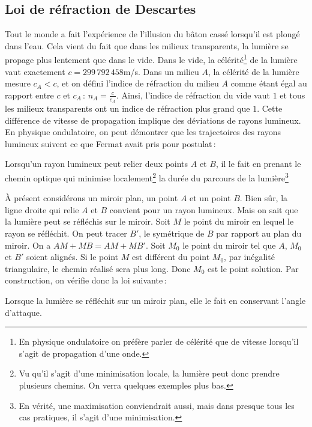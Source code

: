 	\subsection{Loi de réfraction de Descartes}
		Tout le monde a fait l'expérience de l'illusion du bâton cassé lorsqu'il est plongé dans l'eau. Cela vient du fait que dans les milieux transparents, la lumière se propage plus lentement que dans le vide. Dans le vide, la célérité\footnote{En physique ondulatoire on préfère parler de célérité que de vitesse lorsqu'il s'agit de propagation d'une onde.} de la lumière vaut exactement $c=299\,792\,458$m/s. Dans un milieu $A$, la célérité de la lumière mesure $c_A<c$, et on défini l'indice de réfraction du milieu $A$ comme étant égal au rapport entre $c$ et $c_A$\,: $n_A=\frac{c}{c_A}$. Ainsi, l'indice de réfraction du vide vaut $1$ et tous les milieux transparents ont un indice de réfraction plus grand que $1$. Cette différence de vitesse de propagation implique des déviations de rayons lumineux. En physique ondulatoire, on peut démontrer que les trajectoires des rayons lumineux suivent ce que Fermat avait pris pour postulat\,:
		\begin{post}
			Lorsqu'un rayon lumineux peut relier deux points $A$ et $B$, il le fait en prenant le chemin optique qui minimise localement\footnote{Vu qu'il s'agit d'une minimisation locale, la lumière peut donc prendre plusieurs chemins. On verra quelques exemples plus bas.} la durée du parcours de la lumière\footnote{En vérité, une maximisation conviendrait aussi, mais dans presque tous les cas pratiques, il s'agit d'une minimisation.}
		\end{post}

		À présent considérons un miroir plan, un point $A$ et un point $B$. Bien sûr, la ligne droite qui relie $A$ et $B$ convient pour un rayon lumineux. Mais on sait que la lumière peut se réfléchis sur le miroir. Soit $M$ le point du miroir en lequel le rayon se réfléchit. On peut tracer $B'$, le symétrique de $B$ par rapport au plan du miroir. On a $AM+MB=AM+MB'$. Soit $M_0$ le point du miroir tel que $A$, $M_0$ et $B'$ soient alignés. Si le point $M$ est différent du point $M_0$, par inégalité triangulaire, le chemin réalisé sera plus long. Donc $M_0$ est le point solution. Par construction, on vérifie donc la loi suivante\,:
		\begin{thm}
			Lorsque la lumière se réfléchit sur un miroir plan, elle le fait en conservant l'angle d'attaque.
		\end{thm}

